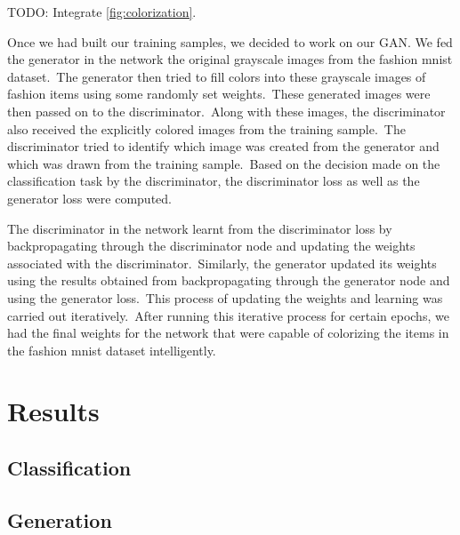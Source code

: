 \documentclass[conference]{IEEEtran}
\begin{document}
    TODO: Integrate \autoref{fig:colorization}.

    Once we had built our training samples, we decided to work on our GAN. We fed the generator in the network the original grayscale images from the fashion mnist dataset.\ The generator then tried to fill colors into these grayscale images of fashion items using some randomly set weights.\ These generated images were then passed on to the discriminator.\ Along with these images, the discriminator also received the explicitly colored images from the training sample.\ The discriminator tried to identify which image was created from the generator and which was drawn from the training sample.\ Based on the decision made on the classification task by the discriminator, the discriminator loss as well as the generator loss were computed.

    The discriminator in the network learnt from the discriminator loss by backpropagating through the discriminator node and updating the weights associated with the discriminator.\ Similarly, the generator updated its weights using the results obtained from backpropagating through the generator node and using the generator loss.\ This process of updating the weights and learning was carried out iteratively.\ After running this iterative process for certain epochs, we had the final weights for the network that were capable of colorizing the items in the fashion mnist dataset intelligently.

    \section{Results}\label{sec:results}

    \subsection{Classification}\label{subsec:results-classification}



    \subsection{Generation}\label{subsec:results-generation}
\end{document}
